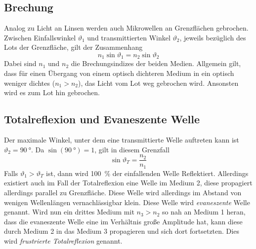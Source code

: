 \subsection{Brechung}
Analog zu Licht an Linsen werden auch Mikrowellen an Grenzflächen gebrochen. Zwischen Einfallswinkel $ \vartheta_1 $ und transmittierten Winkel $ \vartheta_2 $, jeweils bezüglich des Lots der Grenzfläche, gilt der Zusammenhang
\begin{equation}
	n_{1}\sin \vartheta_{1}=n_{2}\sin\vartheta_{2}
\end{equation}
Dabei sind $ n_1 $ und $ n_2 $ die Brechungsindizes der beiden Medien. Allgemein gilt, dass für einen Übergang von einem optisch dichteren Medium in ein optisch weniger dichtes ($ n_1 > n_2 $), das Licht vom Lot weg gebrochen wird. Ansonsten wird es zum Lot hin gebrochen.
\subsection{Totalreflexion und Evaneszente Welle}
Der maximale Winkel, unter dem eine transmittierte Welle auftreten kann ist $ \vartheta_2 = \SI{90}{\degree} $. Da $ \sin(\SI{90}{\degree}) = 1 $, gilt in diesem Grenzfall
\begin{equation}
\sin\vartheta_{T}=\frac{n_{2}}{n_{1}}
\end{equation}
Falls $ \vartheta_{1}>\vartheta_{T} $ ist, dann wird \SI{100}{\percent} der einfallenden Welle Reflektiert.
Allerdings existiert auch im Fall der Totalreflexion eine Welle im Medium 2, diese propagiert allerdings parallel zu Grenzfläche. Diese Welle wird allerdings im Abstand von wenigen Wellenlängen vernachlässigbar klein. Diese Welle wird \textit{evaneszente} Welle genannt.
Wird nun ein drittes Medium mit $ n_{3}>n_{2} $ so nah an Medium 1 heran, dass die evaneszente Welle eine im Verhältnis große Amplitude hat, kann diese durch Medium 2 in das Medium 3 propagieren und sich dort fortsetzten. Dies wird \textit{frustrierte Totalreflexion} genannt.

